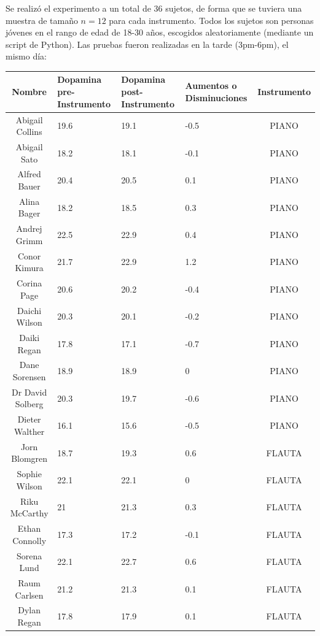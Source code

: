 Se realizó el experimento a un total de 36 sujetos, de forma que se tuviera una muestra de tamaño $n=12$ para cada instrumento. Todos los sujetos son personas jóvenes en el rango de edad de 18-30 años, escogidos aleatoriamente (mediante un script de Python). Las pruebas fueron realizadas en la tarde (3pm-6pm), el mismo día:

\begin{table}[H]
    \begin{center}
        \begin{tabular}{|c |p{2.5cm} |p{2.5cm} |p{3cm}|c|}
            \hline
            \textbf{Nombre} & {\textbf{Dopamina pre-Instrumento}} & {\textbf{Dopamina post-Instrumento}} & {\textbf{Aumentos o Disminuciones}} & \textbf{Instrumento} \\
            \hline
            Abigail Collins & 19.6 & 19.1 & -0.5 & PIANO \\
            Abigail Sato & 18.2 & 18.1 & -0.1 & PIANO \\
            Alfred Bauer & 20.4 & 20.5 & 0.1 & PIANO \\
            Alina Bager & 18.2 & 18.5 & 0.3 & PIANO \\
            Andrej Grimm & 22.5 & 22.9 & 0.4 & PIANO \\
            Conor Kimura & 21.7 & 22.9 & 1.2 & PIANO \\
            Corina Page & 20.6 & 20.2 & -0.4 & PIANO \\
            Daichi Wilson & 20.3 & 20.1 & -0.2 & PIANO \\
            Daiki Regan & 17.8 & 17.1 & -0.7 & PIANO \\
            Dane Sorensen & 18.9 & 18.9 & 0 & PIANO \\
            Dr David Solberg & 20.3 & 19.7 & -0.6 & PIANO \\
            Dieter Walther & 16.1 & 15.6 & -0.5 & PIANO \\
            Jorn Blomgren & 18.7 & 19.3 & 0.6 & FLAUTA \\
            Sophie Wilson & 22.1 & 22.1 & 0 & FLAUTA \\
            Riku McCarthy & 21 & 21.3 & 0.3 & FLAUTA \\
            Ethan Connolly & 17.3 & 17.2 & -0.1 & FLAUTA \\
            Sorena Lund & 22.1 & 22.7 & 0.6 & FLAUTA \\
            Raum Carlsen & 21.2 & 21.3 & 0.1 & FLAUTA \\
            Dylan Regan & 17.8 & 17.9 & 0.1 & FLAUTA \\

\end{tabular}
\end{center}
\end{table}
